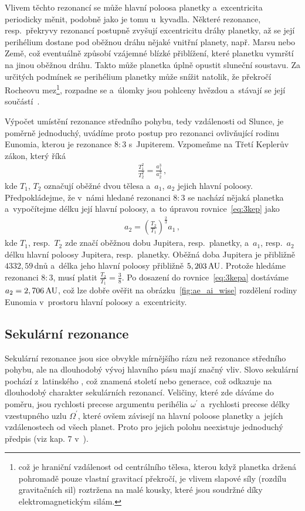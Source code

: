 \documentclass[A4paper, 12pt, oneside]{book}
\begin{document}
Vlivem těchto rezonancí se může hlavní poloosa planetky a~excentricita periodicky měnit, podobně jako je tomu u~kyvadla. Některé rezonance, resp.\ překryvy rezonancí postupně zvyšují excentricitu dráhy planetky, až se její perihélium dostane pod oběžnou dráhu nějaké vnitřní planety, např. Marsu nebo Země, což eventuálně způsobí vzájemné blízké přiblížení, které planetku vymrští na jinou oběžnou dráhu. Takto může planetka úplně opustit sluneční soustavu. Za určitých podmínek se perihélium planetky může snížit natolik, že překročí Rocheovu mez\footnote{což je hraniční vzdálenost od centrálního tělesa, kterou když planetka držená pohromadě pouze vlastní gravitací překročí, je vlivem slapové síly (rozdílu gravitačních sil) roztržena na malé kousky, které jsou soudržné díky elektromagnetickým silám.}, rozpadne se a~úlomky jsou pohlceny hvězdou a~stávají se její součástí~\cite{pichierri17}.

Výpočet umístění rezonance středního pohybu, tedy vzdálenosti od Slunce, je poměrně jednoduchý, uvádíme proto postup pro rezonanci ovlivňující rodinu Eunomia, kterou je rezonance $8:3$ s~Jupiterem. Vzpomeňme na Třetí Keplerův zákon, který říká
\begin{align} \label{eq:3kep}
	\frac{T_1^2}{T_2^2}=\frac{a_1^3}{a_2^3}\,, 
\end{align}
kde $T_1$, $T_2$ označují oběžné dvou tělesa a~$a_1$, $a_2$ jejich hlavní poloosy. Předpokládejme, že v~námi hledané rezonanci $8:3$ se nachází nějaká planetka a~vypočítejme délku její hlavní poloosy, a~to úpravou rovnice~\eqref{eq:3kep} jako
\begin{align} \label{eq:3kepa}
	a_2=\left(\frac{T_2}{T_1}\right)^{\frac{2}{3}}a_1\,,
\end{align}
kde $T_1$, resp.\ $T_2$ zde značí oběžnou dobu Jupitera, resp.\ planetky, a~$a_1$, resp.\ $a_2$ délku hlavní poloosy Jupitera, resp.\ planetky. Oběžná doba Jupitera je přibližně $4332,59\,$dnů a~délka jeho hlavní poloosy přibližně $5,203\,{\rm AU}$. Protože hledáme rezonanci $8:3$, musí platit $\frac{T_2}{T_1}=\frac{3}{8}$. Po dosazení do rovnice~\eqref{eq:3kepa} dostáváme $a_2=2,706\,{\rm AU}$, což lze dobře ověřit na obrázku~\ref{fig:ae_ai_wise} rozdělení rodiny Eunomia v~prostoru hlavní poloosy a~excentricity.
\subsection{Sekulární rezonance} 
Sekulární rezonance jsou sice obvykle mírnějšího rázu než rezonance středního pohybu, ale na dlouhodobý vývoj hlavního pásu mají značný vliv. Slovo sekulární pochází z~latinského , což znamená století nebo generace, což odkazuje na dlouhodobý charakter sekulárních rezonancí. Veličiny, které zde dáváme do poměru, jsou rychlosti precese argumentu perihélia $\omega^\prime$ a~rychlosti precese délky vzestupného uzlu $\Omega^\prime$, které ovšem závisejí na hlavní poloose planetky a~jejích vzdálenostech od všech planet. Proto pro jejich polohu neexistuje jednoduchý předpis (viz kap. 7 v~\cite{murray00}).
\end{document}
